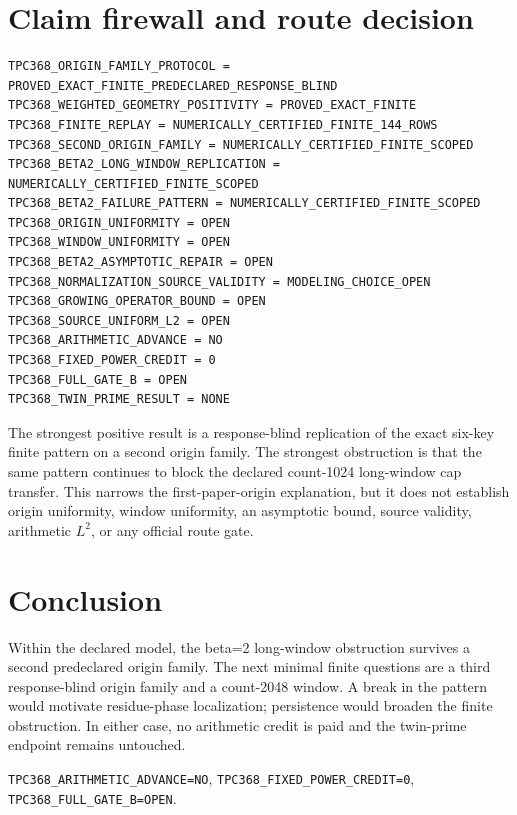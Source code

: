 \documentclass[10pt]{article}
\begin{document}
\section{Claim firewall and route decision}

\begin{verbatim}
TPC368_ORIGIN_FAMILY_PROTOCOL = PROVED_EXACT_FINITE_PREDECLARED_RESPONSE_BLIND
TPC368_WEIGHTED_GEOMETRY_POSITIVITY = PROVED_EXACT_FINITE
TPC368_FINITE_REPLAY = NUMERICALLY_CERTIFIED_FINITE_144_ROWS
TPC368_SECOND_ORIGIN_FAMILY = NUMERICALLY_CERTIFIED_FINITE_SCOPED
TPC368_BETA2_LONG_WINDOW_REPLICATION = NUMERICALLY_CERTIFIED_FINITE_SCOPED
TPC368_BETA2_FAILURE_PATTERN = NUMERICALLY_CERTIFIED_FINITE_SCOPED
TPC368_ORIGIN_UNIFORMITY = OPEN
TPC368_WINDOW_UNIFORMITY = OPEN
TPC368_BETA2_ASYMPTOTIC_REPAIR = OPEN
TPC368_NORMALIZATION_SOURCE_VALIDITY = MODELING_CHOICE_OPEN
TPC368_GROWING_OPERATOR_BOUND = OPEN
TPC368_SOURCE_UNIFORM_L2 = OPEN
TPC368_ARITHMETIC_ADVANCE = NO
TPC368_FIXED_POWER_CREDIT = 0
TPC368_FULL_GATE_B = OPEN
TPC368_TWIN_PRIME_RESULT = NONE
\end{verbatim}

The strongest positive result is a response-blind replication of the exact
six-key finite pattern on a second origin family.  The strongest obstruction
is that the same pattern continues to block the declared count-1024
long-window cap transfer.  This narrows the first-paper-origin explanation,
but it does not establish origin uniformity, window uniformity, an asymptotic
bound, source validity, arithmetic $L^2$, or any official route gate.

\section{Conclusion}

Within the declared model, the beta=2 long-window obstruction survives a
second predeclared origin family.  The next minimal finite questions are a
third response-blind origin family and a count-2048 window.  A break in the
pattern would motivate residue-phase localization; persistence would broaden
the finite obstruction.  In either case, no arithmetic credit is paid and
the twin-prime endpoint remains untouched.

\begin{center}\small
\texttt{TPC368\_ARITHMETIC\_ADVANCE=NO},\quad
\texttt{TPC368\_FIXED\_POWER\_CREDIT=0},\quad
\texttt{TPC368\_FULL\_GATE\_B=OPEN}.
\end{center}
\end{document}

